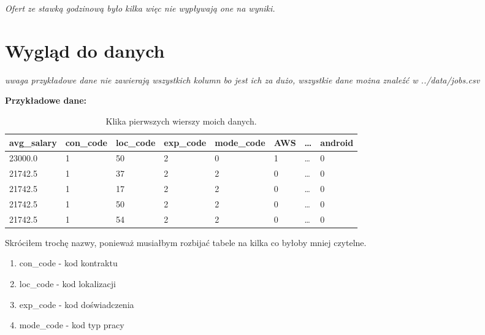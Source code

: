\documentclass[a4paper]{article}
\begin{document}
\textit{Ofert ze stawką godzinową było kilka więc nie wypływają one na wyniki.}

\newpage

\section{Wygląd do danych}

\textit{uwaga przykładowe dane nie zawierają wszystkich kolumn bo jest ich za dużo, wszystkie dane można znaleźć w ../data/jobs.csv}


\textbf{Przykładowe dane:}

\begin{table}[H]
    \centering
    \begin{tabular}{|l|l|l|l|l|l|l|l|}
        \hline
        \textbf{avg\_salary} & \textbf{con\_code} & \textbf{loc\_code} & \textbf{exp\_code} & \textbf{mode\_code} & \textbf{AWS} & \dots & \textbf{android} \\ \hline
        23000.0              & 1                  & 50                 & 2                  & 0                   & 1            & \dots & 0                \\ \hline
        21742.5              & 1                  & 37                 & 2                  & 2                   & 0            & \dots & 0                \\ \hline
        21742.5              & 1                  & 17                 & 2                  & 2                   & 0            & \dots & 0                \\ \hline
        21742.5              & 1                  & 50                 & 2                  & 2                   & 0            & \dots & 0                \\ \hline
        21742.5              & 1                  & 54                 & 2                  & 2                   & 0            & \dots & 0                \\ \hline
    \end{tabular}
    \caption{Klika pierwszych wierszy moich danych.}
\end{table}



\begin{center}
    \begin{tcolorbox}[colback=white,colframe=blue, title=Uwaga]
        Skróciłem trochę nazwy, ponieważ musiałbym rozbijać tabele na kilka co byłoby mniej czytelne.
        \begin{enumerate}
            \raggedright
            \item con\_code - kod kontraktu
            \item loc\_code - kod lokalizacji
            \item exp\_code - kod doświadczenia
            \item mode\_code - kod typ pracy
        \end{enumerate}
    \end{tcolorbox}
\end{center}
\end{document}
